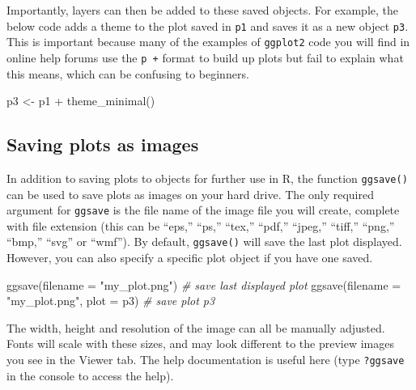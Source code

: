 \documentclass[
  english,
  doc,floatsintext]{apa6}
\newenvironment{Shaded}{\begin{snugshade}}{\end{snugshade}}
\newcommand{\AttributeTok}[1]{\textcolor[rgb]{0.77,0.63,0.00}{#1}}
\newcommand{\CommentTok}[1]{\textcolor[rgb]{0.56,0.35,0.01}{\textit{#1}}}
\newcommand{\FunctionTok}[1]{\textcolor[rgb]{0.00,0.00,0.00}{#1}}
\newcommand{\NormalTok}[1]{#1}
\newcommand{\OtherTok}[1]{\textcolor[rgb]{0.56,0.35,0.01}{#1}}
\newcommand{\SpecialCharTok}[1]{\textcolor[rgb]{0.00,0.00,0.00}{#1}}
\newcommand{\StringTok}[1]{\textcolor[rgb]{0.31,0.60,0.02}{#1}}
\begin{document}
Importantly, layers can then be added to these saved objects. For example, the below code adds a theme to the plot saved in \texttt{p1} and saves it as a new object \texttt{p3}. This is important because many of the examples of \texttt{ggplot2} code you will find in online help forums use the \texttt{p\ +} format to build up plots but fail to explain what this means, which can be confusing to beginners.

\begin{Shaded}
\begin{Highlighting}[]
\NormalTok{p3 }\OtherTok{\textless{}{-}}\NormalTok{ p1 }\SpecialCharTok{+} \FunctionTok{theme\_minimal}\NormalTok{()}
\end{Highlighting}
\end{Shaded}

\hypertarget{saving-plots-as-images}{%
\subsection{Saving plots as images}\label{saving-plots-as-images}}

In addition to saving plots to objects for further use in R, the function \texttt{ggsave()} can be used to save plots as images on your hard drive. The only required argument for \texttt{ggsave} is the file name of the image file you will create, complete with file extension (this can be ``eps,'' ``ps,'' ``tex,'' ``pdf,'' ``jpeg,'' ``tiff,'' ``png,'' ``bmp,'' ``svg'' or ``wmf''). By default, \texttt{ggsave()} will save the last plot displayed. However, you can also specify a specific plot object if you have one saved.

\begin{Shaded}
\begin{Highlighting}[]
\FunctionTok{ggsave}\NormalTok{(}\AttributeTok{filename =} \StringTok{"my\_plot.png"}\NormalTok{) }\CommentTok{\# save last displayed plot}
\FunctionTok{ggsave}\NormalTok{(}\AttributeTok{filename =} \StringTok{"my\_plot.png"}\NormalTok{, }\AttributeTok{plot =}\NormalTok{ p3) }\CommentTok{\# save plot p3}
\end{Highlighting}
\end{Shaded}

The width, height and resolution of the image can all be manually adjusted. Fonts will scale with these sizes, and may look different to the preview images you see in the Viewer tab. The help documentation is useful here (type \texttt{?ggsave} in the console to access the help).
\end{document}
